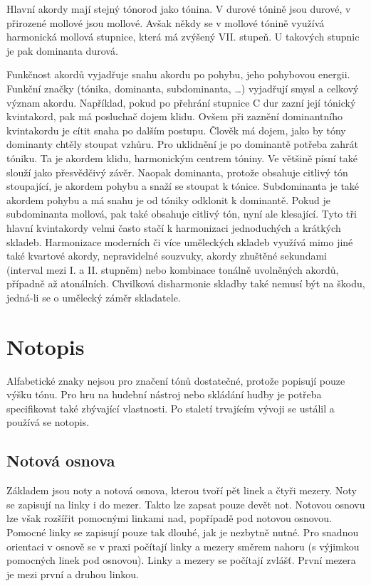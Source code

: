 Hlavní akordy mají stejný tónorod jako tónina.
V durové tónině jsou durové, v přirozené mollové jsou mollové.
Avšak někdy se v mollové tónině využívá harmonická mollová stupnice,
která má zvýšený VII. stupeň.
U takových stupnic je pak dominanta durová.
\cite{kofron}
\par

Funkčnost akordů vyjadřuje snahu akordu po pohybu, jeho pohybovou energii.
Funkční značky (tónika, dominanta, subdominanta, \dots) 
vyjadřují smysl a celkový význam akordu.
Například, pokud po přehrání stupnice C dur zazní její tónický kvintakord,
pak má posluchač dojem klidu.
Ovšem při zaznění dominantního kvintakordu je cítit snaha po dalším postupu.
Člověk má dojem, jako by tóny dominanty chtěly stoupat vzhůru.
Pro uklidnění je po dominantě potřeba zahrát tóniku.
Ta je akordem klidu, harmonickým centrem tóniny.
\cite{kofron}
Ve většině písní také slouží jako přesvědčivý závěr.
\cite{zenkl}
Naopak dominanta, protože obsahuje citlivý tón stoupající, 
je akordem pohybu a snaží se stoupat k tónice.
\cite{kofron}
Subdominanta je také akordem pohybu 
a má snahu je od tóniky odklonit k dominantě.
\cite{zenkl}
Pokud je subdominanta mollová, pak také obsahuje citlivý tón, 
nyní ale klesající.
Tyto tři hlavní kvintakordy velmi často stačí 
k harmonizaci jednoduchých a krátkých skladeb.
\cite{kofron}
Harmonizace moderních či více uměleckých skladeb využívá mimo jiné
také kvartové akordy, nepravidelné souzvuky,
akordy zhuštěné sekundami (interval mezi I. a II. stupněm) nebo
kombinace tonálně uvolněných akordů, případně až atonálních.
Chvilková disharmonie skladby také nemusí být na škodu,
jedná-li se o umělecký záměr skladatele.
\cite{zenkl}
\par

\section{Notopis}
Alfabetické znaky nejsou pro značení tónů dostatečné, protože popisují pouze výšku tónu.
Pro hru na hudební nástroj nebo skládání hudby je potřeba specifikovat také zbývající vlastnosti.
Po staletí trvajícím vývoji se ustálil a používá se notopis.\par

\subsection{Notová osnova}
Základem jsou noty a notová osnova, kterou tvoří pět linek a čtyři mezery.
Noty se zapisují na linky i do mezer.
Takto lze zapsat pouze devět not.
Notovou osnovu lze však rozšířit pomocnými linkami nad, popřípadě pod notovou osnovou. 
Pomocné linky se zapisují pouze tak dlouhé, jak je nezbytně nutné.
Pro snadnou orientaci v osnově se v praxi počítají linky a mezery směrem nahoru (s výjimkou pomocných linek pod osnovou). 
Linky a mezery se počítají zvlášť. 
První mezera je mezi první a druhou linkou.\par

